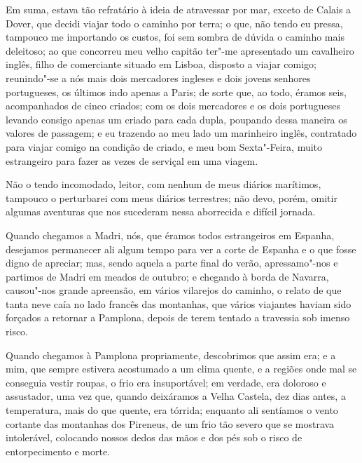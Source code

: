 Em suma, estava tão refratário à ideia de atravessar por mar, exceto de
Calais a Dover, que decidi viajar todo o caminho por terra; o que, não
tendo eu pressa, tampouco me importando os custos, foi sem sombra de
dúvida o caminho mais deleitoso; ao que concorreu meu velho capitão
ter"-me apresentado um cavalheiro inglês, filho de comerciante situado em
Lisboa, disposto a viajar comigo; reunindo"-se a nós mais dois mercadores
ingleses e dois jovens senhores portugueses, os últimos indo apenas a
Paris; de sorte que, ao todo, éramos seis, acompanhados de cinco
criados; com os dois mercadores e os dois portugueses levando consigo
apenas um criado para cada dupla, poupando dessa maneira os valores de
passagem; e eu trazendo ao meu lado um marinheiro inglês, contratado
para viajar comigo na condição de criado, e meu bom Sexta"-Feira, muito
estrangeiro para fazer as vezes de serviçal em uma viagem.


Não o tendo incomodado, leitor, com nenhum de meus diários marítimos,
tampouco o perturbarei com meus diários terrestres; não devo, porém,
omitir algumas aventuras que nos sucederam nessa aborrecida e difícil
jornada.

Quando chegamos a Madri, nós, que éramos todos estrangeiros em Espanha,
desejamos permanecer ali algum tempo para ver a corte de Espanha e o que
fosse digno de apreciar; mas, sendo aquela a parte final do verão,
apressamo"-nos e partimos de Madri em meados de outubro; e chegando à
borda de Navarra, causou"-nos grande apreensão, em vários vilarejos do
caminho, o relato de que tanta neve caía no lado francês das montanhas,
que vários viajantes haviam sido forçados a retornar a Pamplona, depois
de terem tentado a travessia sob imenso risco.

Quando chegamos à Pamplona propriamente, descobrimos que assim era; e a
mim, que sempre estivera acostumado a um clima quente, e a regiões onde
mal se conseguia vestir roupas, o frio era insuportável; em verdade, era
doloroso e assustador, uma vez que, quando deixáramos a Velha Castela,
dez dias antes, a temperatura, mais do que quente, era tórrida; enquanto
ali sentíamos o vento cortante das montanhas dos Pireneus, de um frio
tão severo que se mostrava intolerável, colocando nossos dedos das mãos
e dos pés sob o risco de entorpecimento e morte.

